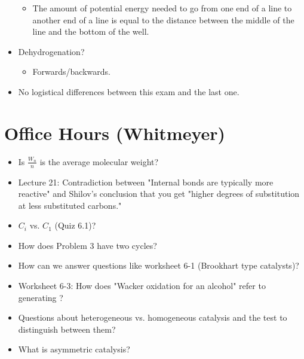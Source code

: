 \documentclass[../notes.tex]{subfiles}
\begin{document}
\begin{itemize}
    \begin{itemize}
        \item The amount of potential energy needed to go from one end of a line to another end of a line is equal to the distance between the middle of the line and the bottom of the well.
    \end{itemize}
    \item Dehydrogenation?
    \begin{itemize}
        \item Forwards/backwards.
    \end{itemize}
    \item No logistical differences between this exam and the last one.
\end{itemize}



\section{Office Hours (Whitmeyer)}
\begin{itemize}
    \item {}Is $\frac{W_n}{n}$ is the average molecular weight?
    \item Lecture 21: Contradiction between "Internal  bonds are typically more reactive" and Shilov's conclusion that you get "higher degrees of substitution at less substituted carbons."
    \item $C_i$ vs. $C_1$ (Quiz 6.1)?
    \item How does Problem 3 have two cycles?
    \item How can we answer questions like worksheet 6-1 (Brookhart type catalysts)?
    \item Worksheet 6-3: How does "Wacker oxidation for an alcohol" refer to generating ?
    \item Questions about heterogeneous vs. homogeneous catalysis and the test to distinguish between them?
    \item What is asymmetric catalysis?
\end{itemize}
\end{document}
